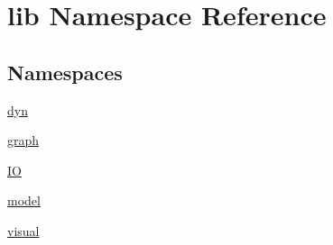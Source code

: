\hypertarget{a00138}{\section{lib Namespace Reference}
\label{a00138}
}
\subsection*{Namespaces}
\begin{DoxyCompactItemize}
\item 
 \hyperlink{a00139}{dyn}
\item 
 \hyperlink{a00141}{graph}
\item 
 \hyperlink{a00145}{I\+O}
\item 
 \hyperlink{a00148}{model}
\item 
 \hyperlink{a00151}{visual}
\end{DoxyCompactItemize}
